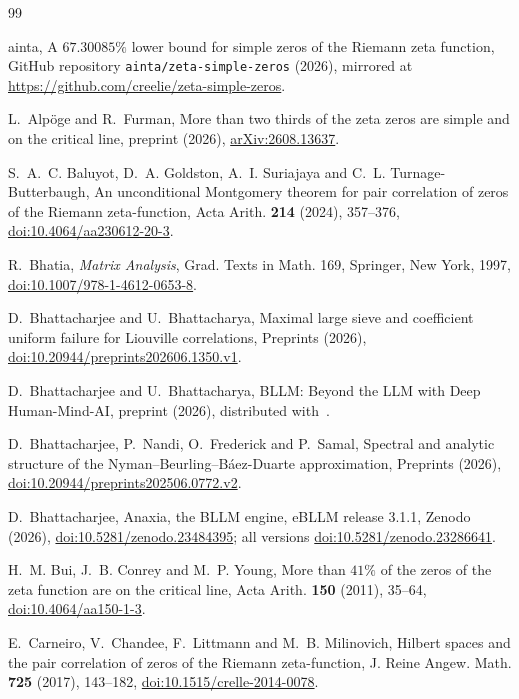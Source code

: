 \documentclass[aps,prd,twocolumn,superscriptaddress,nofootinbib,longbibliography,floatfix,showkeys,amsmath,amssymb,10pt]{revtex4-2}
\theoremstyle{definition}
\theoremstyle{remark}
\begin{document}
\begin{thebibliography}{99}\raggedright\advance\leftskip{}

ainta, A $67.30085\%$ lower bound for simple zeros of the Riemann zeta
function, GitHub repository \nolinkurl{ainta/zeta-simple-zeros} (2026),
mirrored at \url{https://github.com/creelie/zeta-simple-zeros}.

L.~Alp\"oge and R.~Furman, More than two thirds of the zeta zeros are simple
and on the critical line, preprint (2026),
\href{https://arxiv.org/abs/2608.13637}{arXiv:2608.13637}.

S.~A.~C. Baluyot, D.~A. Goldston, A.~I. Suriajaya and C.~L.
Turnage-Butterbaugh, An unconditional Montgomery theorem for pair
correlation of zeros of the Riemann zeta-function, Acta Arith. \textbf{214}
(2024), 357--376,
\href{https://doi.org/10.4064/aa230612-20-3}{doi:10.4064/aa230612-20-3}.

R.~Bhatia, \emph{Matrix Analysis}, Grad. Texts in Math. 169, Springer, New
York, 1997,
\href{https://doi.org/10.1007/978-1-4612-0653-8}{doi:10.1007/978-1-4612-0653-8}.

D.~Bhattacharjee and U.~Bhattacharya, Maximal large sieve and coefficient
uniform failure for Liouville correlations, Preprints (2026),
\href{https://doi.org/10.20944/preprints202606.1350.v1}{doi:10.20944/preprints202606.1350.v1}.

D.~Bhattacharjee and U.~Bhattacharya, BLLM: Beyond the LLM with Deep
Human-Mind-AI, preprint (2026), distributed with~\cite{Ana26}.

D.~Bhattacharjee, P.~Nandi, O.~Frederick and P.~Samal, Spectral and
analytic structure of the Nyman--Beurling--B\'aez-Duarte approximation,
Preprints (2026),
\href{https://doi.org/10.20944/preprints202506.0772.v2}{doi:10.20944/preprints202506.0772.v2}.

D.~Bhattacharjee, Anaxia, the BLLM engine, eBLLM release 3.1.1, Zenodo
(2026), \href{https://doi.org/10.5281/zenodo.23484395}{doi:10.5281/zenodo.23484395};
all versions
\href{https://doi.org/10.5281/zenodo.23286641}{doi:10.5281/zenodo.23286641}.

H.~M. Bui, J.~B. Conrey and M.~P. Young, More than $41\%$ of the zeros of
the zeta function are on the critical line, Acta Arith. \textbf{150}
(2011), 35--64,
\href{https://doi.org/10.4064/aa150-1-3}{doi:10.4064/aa150-1-3}.

E.~Carneiro, V.~Chandee, F.~Littmann and M.~B. Milinovich, Hilbert spaces
and the pair correlation of zeros of the Riemann zeta-function, J. Reine
Angew. Math. \textbf{725} (2017), 143--182,
\href{https://doi.org/10.1515/crelle-2014-0078}{doi:10.1515/crelle-2014-0078}.


\end{thebibliography}
\end{document}
